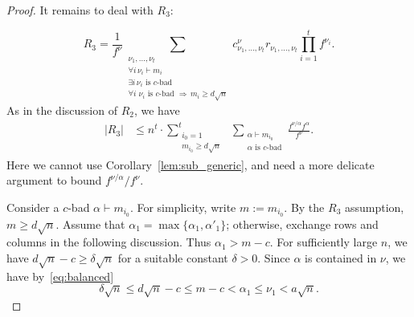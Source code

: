 \documentclass[12pt]%
{amsart}
\newcommand{\al}{{\alpha}}
\theoremstyle{plain}
\theoremstyle{definition}
\theoremstyle{remark}
\newcommand{\ve}{\varepsilon}
\begin{document}
\begin{proof}
\medskip

It remains to deal with $R_3$:

\[
    R_3 
    = \frac{1}{f^\nu} \sum_{\substack{\nu_1,\ldots,\nu_t \\ \forall i\, \nu_i \vdash m_i \\
    \exists i\, \nu_i \text{ is $c$-bad} \\ \forall i\,\, \nu_i \text{ is $c$-bad } \Rightarrow\, m_i \ge d \sqrt n}} c^\nu_{\nu_1,\ldots,\nu_t} r_{\nu_1, \dots, \nu_t} \prod_{i=1}^t f^{\nu_i} .
\]
As in the discussion of $R_2$, we have
\begin{align}\label{eq:expansionR3}
    |R_3| 
    &\le n^t \cdot
    \sum_{\substack{i_0 = 1 \\ m_{i_0} \ge d \sqrt n}}^{t} \,\,\sum_{\substack{\al \vdash m_{i_0} \\ \al \text{ is $c$-bad}}}
    \frac{f^{\nu/\al} f^\al}{f^\nu} .
\end{align}
Here we cannot use Corollary~\ref{lem:sub_generic}, and need a more delicate argument to bound $f^{\nu/\al}/f^\nu$.

Consider a $c$-bad $\al\vdash m_{i_0}$. For simplicity, write $m := m_{i_0}$.
By the $R_3$ assumption, $m \ge d \sqrt n$. 
Assume that $\al_1 = \max \{\al_1, \al'_1\}$; otherwise, exchange rows and columns in the following discussion.
Thus $\al_1 > m - c$.
For sufficiently large $n$, we have $d \sqrt n - c\ge \delta\sqrt n$ for a suitable constant $\delta>0$.
Since $\al$ is contained in $\nu$, we have by~\eqref{eq:balanced}
\begin{equation}\label{eq:alpah_nu_bounds}
    \delta\sqrt n
    \le d \sqrt n - c
    \le m - c
    < \al_1
    \le \nu_1 
    < a \sqrt n. 
\end{equation}


\end{proof}
\end{document}
